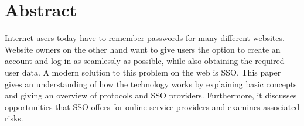 \section*{Abstract}

Internet users today have to remember passwords for many different websites.
Website owners on the other hand want to give users the option to create
an account and log in as seamlessly as possible, while also obtaining
the required user data.
A modern solution to this problem on the web is \ac{SSO}.
This paper gives an understanding of how the technology works by explaining
basic concepts and giving an overview of protocols and \ac{SSO} providers.
Furthermore, it discusses opportunities that \ac{SSO} offers
for online service providers and examines associated risks.